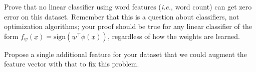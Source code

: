 \documentclass{article}
\theoremstyle{definition}
\newtheorem*{answer}{Answer}
\begin{document}
\begin{question}
\begin{question}
		Prove that no linear classifier using word features (\textit{i.e.}, word count) can get zero error on this dataset. Remember that this is a question about classifiers, not optimization algorithms; your proof should be true for any linear classifier of the form $f_{\underline{w}}(\underline{x})=\text{sign}(\underline{w}^\top\phi(\underline{x}))$, regardless of how the weights are learned.
		
		Propose a single additional feature for your dataset that we could augment the feature vector with that to fix this problem.
%			
%			

\end{question}
\end{question}
\end{document}
